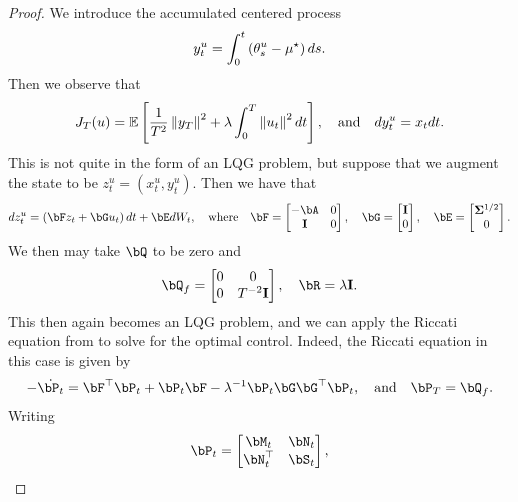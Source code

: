 \begin{proof}
    We introduce the accumulated centered process
    \begin{align}
        y_t^u = \int_0^t \left( \theta_s^u - \mu^{\star} \right) d s.
    \end{align}
    Then we observe that
    \begin{align}
        J_T(u) = \mathbb{E}\left[ \frac 1{T^2} \left\|y_T\right\|^2 + \lambda \int_0^T \left\|u_t\right\|^2 d t \right], \quad \text{and} \quad d y_t^u = x_t d t.
    \end{align}
    This is not quite in the form of an LQG problem, but suppose that we augment the state to be $z_t^u = (x_t^u, y_t^u)$.  Then we have that
    \begin{align}
        d z_t^u = \left( \bF z_t + \bG u_t \right) d t + \bE d W_t, \quad \text{where} \quad \bF = \begin{bmatrix} -\bA & 0 \\ \eye & 0 \end{bmatrix}, \quad \bG = \begin{bmatrix} \eye \\ 0 \end{bmatrix}, \quad \bE = \begin{bmatrix} \bSigma^{1/2} \\ 0 \end{bmatrix}.
    \end{align}
    We then may take $\bQ$ to be zero and
    \begin{align}
        \bQ_f = \begin{bmatrix} 0 & 0 \\ 0 & T^{-2} \eye \end{bmatrix}, \quad \bR = \lambda \eye.
    \end{align}
    This then again becomes an LQG problem, and we can apply the Riccati equation from  to solve for the optimal control.  Indeed, the Riccati equation in this case is given by
    \begin{align}
        - \dot{\bP_t} = \bF^\top \bP_t + \bP_t \bF - \lambda^{-1} \bP_t \bG \bG^\top \bP_t, \quad \text{and} \quad \bP_T = \bQ_f.
    \end{align}
    Writing
    \begin{align}\label{eq:riccati-decomposition}
        \bP_t = \begin{bmatrix}
            \bM_t & \bN_t \\ \bN_t^\top & \bS_t
        \end{bmatrix},
    \end{align}

\end{proof}
